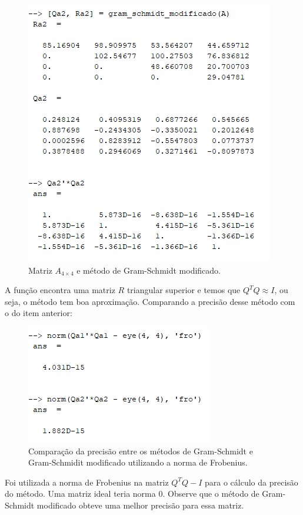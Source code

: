 \documentclass[11pt]{article}
\begin{document}
\begin{enumerate}
            \begin{figure}[H]
                \centering
                \includegraphics[]{2-1}
                \caption{Matriz $A_{4\times4}$ e método de Gram-Schmidt modificado.}
            \end{figure}
        
            A função encontra uma matriz $R$ triangular superior e temos que $Q^TQ \approx I$, ou seja, o método tem boa aproximação. Comparando a precisão desse método com o do item anterior:
        
            \begin{figure}[H]
                \centering
                \includegraphics[]{2-2}
                \caption{Comparação da precisão entre os métodos de Gram-Schmidt e Gram-Schmidit modificado utilizando a norma de Frobenius.}
            \end{figure}
            
            Foi utilizada a norma de Frobenius na matriz $Q^TQ - I$ para o cálculo da precisão do método. Uma matriz ideal teria norma $0$. Observe que o método de Gram-Schmidt modificado obteve uma melhor precisão para essa matriz.
        

\end{enumerate}
\end{document}
